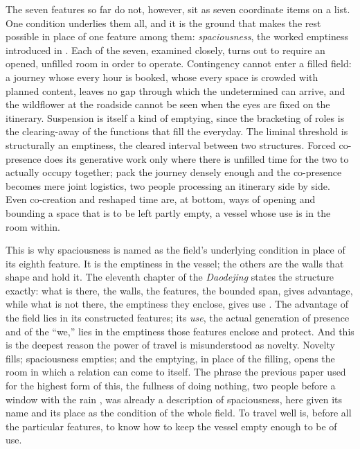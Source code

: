 The seven features so far do not, however, sit as seven coordinate items on a list. One condition underlies them all, and it is the ground that makes the rest possible in place of one feature among them: \emph{spaciousness}, the worked emptiness introduced in . Each of the seven, examined closely, turns out to require an opened, unfilled room in order to operate. Contingency cannot enter a filled field: a journey whose every hour is booked, whose every space is crowded with planned content, leaves no gap through which the undetermined can arrive, and the wildflower at the roadside cannot be seen when the eyes are fixed on the itinerary. Suspension is itself a kind of emptying, since the bracketing of roles is the clearing-away of the functions that fill the everyday. The liminal threshold is structurally an emptiness, the cleared interval between two structures. Forced co-presence does its generative work only where there is unfilled time for the two to actually occupy together; pack the journey densely enough and the co-presence becomes mere joint logistics, two people processing an itinerary side by side. Even co-creation and reshaped time are, at bottom, ways of opening and bounding a space that is to be left partly empty, a vessel whose use is in the room within.

This is why spaciousness is named as the field's underlying condition in place of its eighth feature. It is the emptiness in the vessel; the others are the walls that shape and hold it. The eleventh chapter of the \emph{Daodejing} states the structure exactly: what is there, the walls, the features, the bounded span, gives advantage, while what is not there, the emptiness they enclose, gives use \parencite{laozi1963}. The advantage of the field lies in its constructed features; its \emph{use}, the actual generation of presence and of the ``we,'' lies in the emptiness those features enclose and protect. And this is the deepest reason the power of travel is misunderstood as novelty. Novelty fills; spaciousness empties; and the emptying, in place of the filling, opens the room in which a relation can come to itself. The phrase the previous paper used for the highest form of this, the fullness of doing nothing, two people before a window with the rain \parencite{paperxix}, was already a description of spaciousness, here given its name and its place as the condition of the whole field. To travel well is, before all the particular features, to know how to keep the vessel empty enough to be of use.

